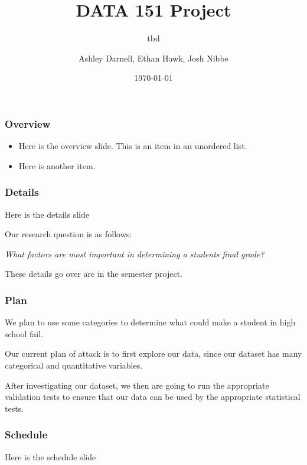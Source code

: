 \documentclass{beamer}
\title{DATA 151 Project}
\subtitle{tbd}
\author{Ashley Darnell, Ethan Hawk, Josh Nibbe}
\institute{Valparaiso Unviersity}
\date{\today}
\begin{document}
\begin{frame}
\titlepage
\end{frame}


\begin{frame}
\frametitle{Overview}
  \begin{itemize}
    \item Here is the overview slide. This is an item in an unordered list.

    \item Here is another item.
  \end{itemize}
\end{frame}


\begin{frame}
\frametitle{Details}
Here is the details slide

Our research question is as follows:

  \begin{center}
    \textit{What factors are most important in determining a students final grade?}
  \end{center}


These details go over are in the semester project.  
\end{frame}


\begin{frame}
\frametitle{Plan}
We plan to use some categories to determine what could make a student in high school fail. 

Our current plan of attack is to first explore our data, since our dataset has many categorical and 
quantitative variables.

After investigating our dataset, we then are going to run the appropriate validation tests to ensure that our data
can be used by the appropriate statistical tests.


\end{frame}

\begin{frame}
\frametitle{Schedule}
Here is the schedule slide
\end{frame}
\end{document}
